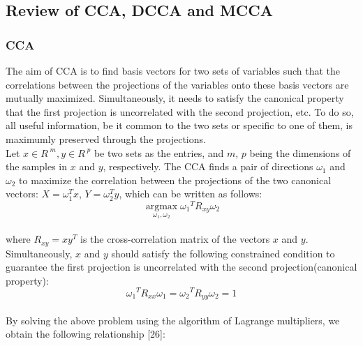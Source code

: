 \documentclass[journal]{IEEEtran}
\begin{document}

\subsection{Review of CCA, DCCA and MCCA}

\subsubsection{CCA}

The aim of CCA is to find basis vectors for two sets of variables such that the correlations between the projections of the variables onto these basis vectors are mutually maximized. Simultaneously, it needs to satisfy the canonical property that the first projection is uncorrelated with the second projection, etc. To do so, all useful information, be it common to the two sets or specific to one of them, is maximumly preserved through the projections.\\\indent Let $ x \in {R^{\;m}},y \in {R^{\;p}} $ be two sets as the entries, and \emph{$ m $}, \emph{$ p $} being the dimensions of the samples in \emph{$ x $} and \emph{$ y $}, respectively. The CCA finds a pair of directions $ \omega_1 $ and $ \omega_2 $ to maximize the correlation between the projections of the two canonical vectors: $ X = \omega_1^Tx  $, $ Y = \omega_2^Ty  $, which can be written as follows:
\begin{equation} \mathop {\arg \max }\limits_{{\omega _1},{\omega _2}}  {\omega _1}^T{R_{xy}}{\omega _2}\end{equation} \\ where
${R_{xy}} = x{y^T}$ is the cross-correlation matrix of the vectors $ x $ and $ y $. \\
Simultaneously, $ x $ and $ y $ should satisfy the following constrained condition to guarantee the first projection is uncorrelated with the second projection(canonical property):
\begin{equation} {\omega _1}^T{R_{xx}}{\omega _1} = {\omega _2}^T{R_{yy}}{\omega _2} = 1 \end{equation} \\ By solving the above problem using the algorithm of Lagrange multipliers, we obtain the following relationship [26]:
\end{document}
